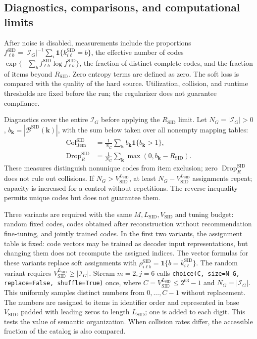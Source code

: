 \documentclass[12pt,a4paper]{article}
\newcommand{\code}[1]{{\ttfamily\small\nolinkurl{#1}}}
\newcommand{\ind}{\mathbf 1}
\theoremstyle{plainru}
\begin{document}
\subsection{Diagnostics, comparisons, and computational limits}
\label{sec:sid-validation}

After noise is disabled, measurements include the proportions
$f_{\ell b}^{\mathrm{SID}}=|\mathcal I_G|^{-1}
\sum_i\ind\{k_{i\ell}^{\mathrm{SID}}=b\}$,
the effective number of codes
$\exp\{-\sum_b f_{\ell b}^{\mathrm{SID}}\log f_{\ell b}^{\mathrm{SID}}\}$,
the fraction of distinct complete codes, and the fraction of items beyond
$R_{\mathrm{SID}}$. Zero entropy terms are defined as zero.
The soft loss is compared with the quality of the hard source.
Utilization, collision, and runtime thresholds are fixed before the run;
the regularizer does not guarantee compliance.

Diagnostics cover the entire $\mathcal I_G$ before applying the
$R_{\mathrm{SID}}$ limit. Let $N_G=|\mathcal I_G|>0$,
$b_{\mathbf k}=|\mathcal B^{\mathrm{SID}}(\mathbf k)|$,
with the sum below taken over all nonempty mapping tables:
\begin{align}
\operatorname{Col}_{\mathrm{item}}^{\mathrm{SID}}
&=\frac1{N_G}\sum_{\mathbf k}
b_{\mathbf k}\ind\{b_{\mathbf k}>1\},\label{eq:sid-catalog-collisions}\\
\operatorname{Drop}_{R}^{\mathrm{SID}}
&=\frac1{N_G}\sum_{\mathbf k}
\max(0,b_{\mathbf k}-R_{\mathrm{SID}}).\nonumber
\end{align}
These measures distinguish nonunique codes from item exclusion;
zero $\operatorname{Drop}_{R}^{\mathrm{SID}}$ does not rule out collisions.
If $N_G>V_{\mathrm{SID}}^{L_{\mathrm{SID}}}$, at least
$N_G-V_{\mathrm{SID}}^{L_{\mathrm{SID}}}$ assignments repeat;
capacity is increased for a control without repetitions.
The reverse inequality permits unique codes but does not guarantee them.

Three variants are required with the same $M,L_{\mathrm{SID}},V_{\mathrm{SID}}$
and tuning budget: random fixed codes, codes obtained after
reconstruction without recommendation fine-tuning, and jointly trained
codes. In the first two variants, the assignment table is fixed:
code vectors may be trained as decoder input representations,
but changing them does not recompute the assigned indices.
The vector formulas for these variants replace soft assignments
with $\rho_{i\ell b}^{\mathrm{SID}}=\ind\{b=k_{i\ell}^{\mathrm{SID}}\}$.
The random variant requires
$V_{\mathrm{SID}}^{L_{\mathrm{SID}}}\ge|\mathcal I_G|$.
Stream $m=2,j=6$ calls
\code{choice(C, size=N_G, replace=False, shuffle=True)} once, where
$C=V_{\mathrm{SID}}^{L_{\mathrm{SID}}}\le2^{63}-1$ and $N_G=|\mathcal I_G|$.
This uniformly samples distinct numbers from $0,\ldots,C-1$ without replacement.
The numbers are assigned to items
in identifier order and represented in base
$V_{\mathrm{SID}}$, padded with leading zeros to length
$L_{\mathrm{SID}}$; one is added to each digit.
This tests the value of semantic organization. When collision
rates differ, the accessible fraction of the catalog is also compared.
\end{document}
